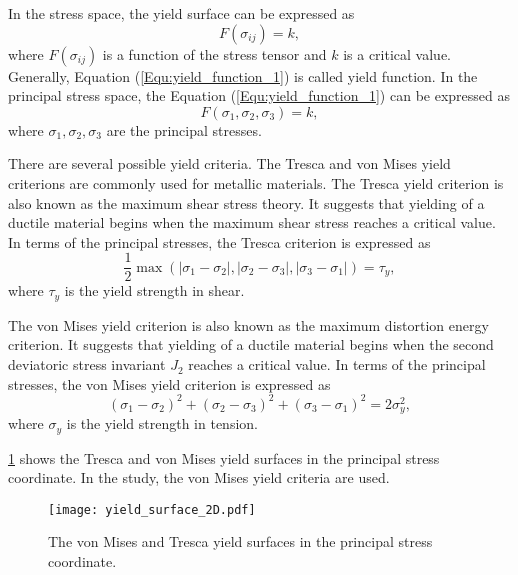 In the stress space, the yield surface can be expressed as
\begin{equation}
F\left( {{\sigma _{ij}}} \right) = k,
\label{Equ:yield_function_1}
\end{equation}
where $F\left( {{\sigma _{ij}}} \right)$ is a function of the stress tensor and $k$ is a critical value. Generally, Equation (\ref{Equ:yield_function_1}) is called yield function. In the principal stress space, the Equation (\ref{Equ:yield_function_1}) can be expressed as
\begin{equation}
F\left( {{\sigma _1},{\sigma _2},{\sigma _3}} \right) = k,
\end{equation}
where ${\sigma _1},{\sigma _2},{\sigma _3}$ are the principal stresses.

There are several possible yield criteria. The Tresca and von Mises yield criterions are commonly used for metallic materials. The Tresca yield criterion is also known as the maximum shear stress theory. It suggests that yielding of a ductile material begins when the maximum shear stress reaches a critical value. In terms of the principal stresses, the Tresca criterion is expressed as
\begin{equation}
\frac{1}{2}\max \left( {\left| {{\sigma _1} - {\sigma _2}} \right|,\left| {{\sigma _2} - {\sigma _3}} \right|,\left| {{\sigma _3} - {\sigma _1}} \right|} \right) = \tau_y,
\end{equation}
where $\tau_y$ is the yield strength in shear.

The von Mises yield criterion is also known as the maximum distortion energy criterion. It suggests that yielding of a ductile material begins when the second deviatoric stress invariant $J_2$ reaches a critical value. In terms of the principal stresses, the von Mises yield criterion is expressed as
\begin{equation}
{\left( {{\sigma _1} - {\sigma _2}} \right)^2} + {\left( {{\sigma _2} - {\sigma _3}} \right)^2} + {\left( {{\sigma _3} - {\sigma _1}} \right)^2} = 2\sigma _y^2,
\end{equation}
where $\sigma_y$ is the yield strength in tension.

\ref{Fig:YieldSurface3D} shows the Tresca and von Mises yield surfaces in the principal stress coordinate. 
In the study, the von Mises yield criteria are used.

\begin{figure}[!htp]
\centering
\texttt{[image: yield\_surface\_2D.pdf]}
\caption{The von Mises and Tresca yield surfaces in the principal stress coordinate.}
\label{Fig:YieldSurface3D}
\end{figure}

